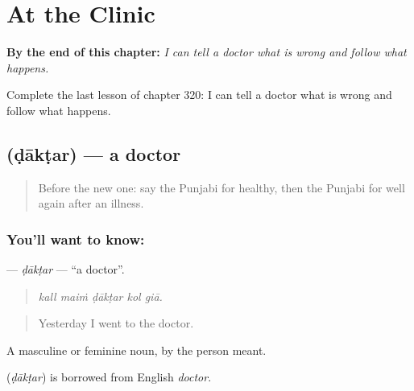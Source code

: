 
\chapter{At the Clinic}
\label{ch:pa-a2-at-the-clinic}

\begin{chapteropening}
\textbf{By the end of this chapter:} \emph{I can tell a doctor what is wrong and follow what happens.}

Complete the last lesson of chapter 320: I can tell a doctor what is wrong and follow what happens.
\end{chapteropening}

\section[\texorpdfstring{\pa{ਡਾਕਟਰ} (ḍākṭar)}{ਡਾਕਟਰ (ḍākṭar)}]{ (ḍākṭar) — a doctor}

\label{lesson:PA-C320-daktar}



\begin{quote}
Before the new one: say the Punjabi for healthy, then the Punjabi for well again after an illness.
\end{quote}

\subsection*{You'll want to know: }
\textbf{} — \emph{ḍākṭar} — \textquotedblleft{}a doctor\textquotedblright{}.

\begin{quote}
    
\end{quote}

\begin{quote}
\emph{kall maiṁ ḍākṭar kol giā.}
\end{quote}

\begin{quote}
Yesterday I went to the doctor.
\end{quote}

A masculine or feminine noun, by the person meant.

\begin{cousinweb}
\textbf{} (\emph{ḍākṭar}) is borrowed from English \emph{doctor}.
\end{cousinweb}

